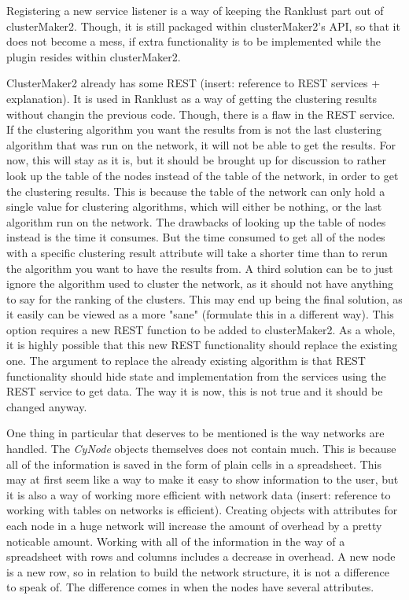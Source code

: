 \documentclass[UKenglish]{ifimaster}
\begin{document}
Registering a new service listener is a way of keeping the Ranklust part out of clusterMaker2. Though, it is still
packaged within clusterMaker2's API, so that it does not become a mess, if extra functionality is to be implemented
while the plugin resides within clusterMaker2.

ClusterMaker2 already has some REST (insert: reference to REST services + explanation). It is used in Ranklust as a way
of getting the clustering results without changin the previous code. Though, there is a flaw in the REST service. If the
clustering algorithm you want the results from is not the last clustering algorithm that was run on the network, it will
not be able to get the results. For now, this will stay as it is, but it should be brought up for discussion to rather
look up the table of the nodes instead of the table of the network, in order to get the clustering results. This is
because the table of the network can only hold a single value for clustering algorithms, which will either be nothing,
or the last algorithm run on the network. The drawbacks of looking up the table of nodes instead is the time it
consumes. But the time consumed to get all of the nodes with a specific clustering result attribute will take a shorter
time than to rerun the algorithm you want to have the results from. A third solution can be to just ignore the algorithm
used to cluster the network, as it should not have anything to say for the ranking of the clusters. This may end up
being the final solution, as it easily can be viewed as a more "sane" (formulate this in a different way). This option
requires a new REST function to be added to clusterMaker2. As a whole, it is highly possible that this new REST
functionality should replace the existing one. The argument to replace the already existing algorithm is that REST
functionality should hide state and implementation from the services using the REST service to get data. The way it is
now, this is not true and it should be changed anyway.

One thing in particular that deserves to be mentioned is the way networks are handled. The \textit{CyNode} objects
themselves does not contain much. This is because all of the information is saved in the form of plain cells in a
spreadsheet. This may at first seem like a way to make it easy to show information to the user, but it is also a way of
working more efficient with network data (insert: reference to working with tables on networks is efficient). Creating
objects with attributes for each node in a huge network will increase the amount of overhead by a pretty noticable
amount. Working with all of the information in the way of a spreadsheet with rows and columns includes a decrease in
overhead. A new node is a new row, so in relation to build the network structure, it is not a difference to speak of.
The difference comes in when the nodes have several attributes. 
\end{document}
